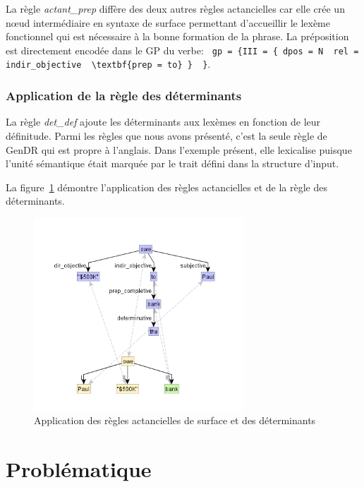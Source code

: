 La règle \emph{actant\_prep} diffère des deux autres règles actancielles car elle crée un n\oe{}ud intermédiaire en syntaxe de surface permettant d'accueillir le lexème fonctionnel  qui est nécessaire à la bonne formation de la phrase. La préposition est directement encodée dans le \ac{GP} du verbe: \lstinline! gp = {III = { dpos = N  rel = indir_objective  \textbf{prep = to} }  }!.

\subsubsection{Application de la règle des déterminants}

La règle \emph{det\_def} ajoute les déterminants aux lexèmes en fonction de leur définitude. Parmi les règles que nous avons présenté, c'est la seule règle de GenDR qui est propre à l'anglais. Dans l'exemple présent, elle lexicalise  puisque l'unité sémantique  était marquée par le trait défini dans la structure d'input.

La figure~\ref{fig:syntsurf} démontre l'application des règles actancielles et de la règle des déterminants.

\begin{figure}[htb]
	\centering
	\includegraphics[width=0.7\textwidth, trim = {0cm 8mm 0cm 15mm},clip]{ch3/figs/rsynts_syntactisation.png}
	\caption{Application des règles actancielles de surface et des déterminants}
	\label{fig:syntsurf}
\end{figure}


\section{Problématique}\label{sec:problema}

